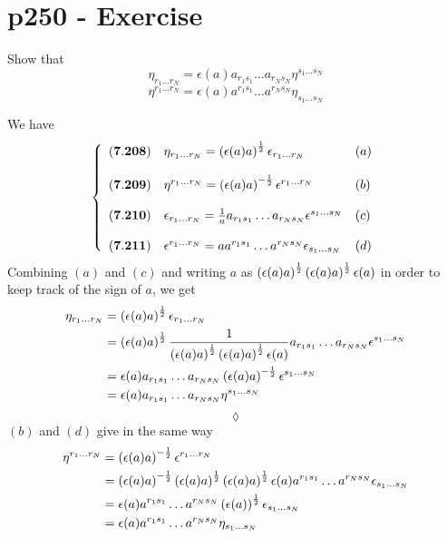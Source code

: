 \section{p250 - Exercise }
\begin{tcolorbox}
Show that
$$\eta_{r_1\dots r_N}= \epsilon(a)a_{r_1s_1}\dots a_{r_Ns_N}\eta^{s_1\dots s_N}$$
$$\eta^{r_1\dots r_N}= \epsilon(a)a^{r_1s_1}\dots a^{r_Ns_N}\eta_{s_1\dots s_N}$$
\end{tcolorbox}
We have 
\begin{align}
\left\{\begin{array}{lll}
(\mathbf{7.208})&\eta_{r_1\dots r_N}= \left(\epsilon(a)a\right)^{\frac{1}{2}}\epsilon_{r_1\dots r_N}&(a)\\\\
(\mathbf{7.209})&\eta^{r_1\dots r_N}= \left(\epsilon(a)a\right)^{-\frac{1}{2}}\epsilon^{r_1\dots r_N}&(b)\\\\
(\mathbf{7.210})&\epsilon_{r_1\dots r_N}= \frac{1}{a} a_{r_1s_1}\dots a_{r_Ns_N}\epsilon^{s_1\dots s_N}&(c)\\\\
(\mathbf{7.211})&\epsilon^{r_1\dots r_N}= a a^{r_1s_1}\dots a^{r_Ns_N}\epsilon_{s_1\dots s_N}&(d)\\
\end{array}\right.
\end{align}
Combining $(a)$ and $(c)$ and writing $a$ as $\left(\epsilon(a)a\right)^{\frac{1}{2}}\left(\epsilon(a)a\right)^{\frac{1}{2}} \epsilon(a)$ in order to keep track of the sign of $a$, we get
\begin{align}
\eta_{r_1\dots r_N} &=\left(\epsilon(a)a\right)^{\frac{1}{2}}\epsilon_{r_1\dots r_N}\\
&=\left(\epsilon(a)a\right)^{\frac{1}{2}}\frac{1}{\left(\epsilon(a)a\right)^{\frac{1}{2}}\left(\epsilon(a)a\right)^{\frac{1}{2}} \epsilon(a)}a_{r_1s_1}\dots a_{r_Ns_N}\epsilon^{s_1\dots s_N}\\
&= \epsilon(a)a_{r_1s_1}\dots a_{r_Ns_N}\left(\epsilon(a)a\right)^{-\frac{1}{2}}\epsilon^{s_1\dots s_N}\\
&= \epsilon(a)a_{r_1s_1}\dots a_{r_Ns_N}\eta^{s_1\dots s_N}\\
\end{align}
$$\lozenge$$
$(b)$ and $(d)$ give in the same way
\begin{align}
\eta^{r_1\dots r_N} &= \left(\epsilon(a)a\right)^{-\frac{1}{2}}\epsilon^{r_1\dots r_N}\\
&=\left(\epsilon(a)a\right)^{-\frac{1}{2}}\left(\epsilon(a)a\right)^{\frac{1}{2}}\left(\epsilon(a)a\right)^{\frac{1}{2}} \epsilon(a)a^{r_1s_1}\dots a^{r_Ns_N}\epsilon_{s_1\dots s_N}\\
&=\epsilon(a)a^{r_1s_1}\dots a^{r_Ns_N}\left(\epsilon(a)\right)^{\frac{1}{2}}\epsilon_{s_1\dots s_N}\\
&=\epsilon(a)a^{r_1s_1}\dots a^{r_Ns_N}\eta_{s_1\dots s_N}
\end{align}


